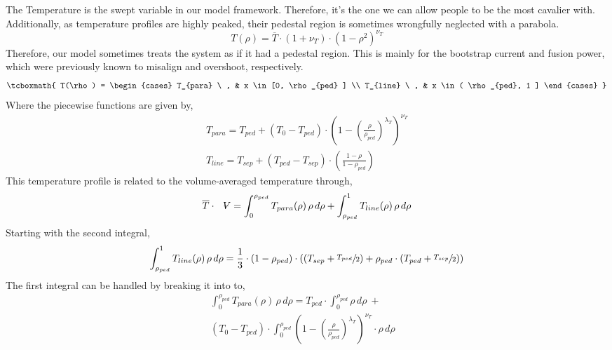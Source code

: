 The Temperature is the swept variable in our model framework. Therefore, it's the one we can allow people to be the most cavalier with. Additionally, as temperature profiles are highly peaked, their pedestal region is sometimes wrongfully neglected with a parabola.
\begin{equation}
	T(\rho) = \overline{T} \cdot \left(1 + \nu_T \right) \cdot \left( 1 - \rho^2  \right)^{\nu_T}
\end{equation}
Therefore, our model sometimes treats the system as if it had a pedestal region. This is mainly for the bootstrap current and fusion power, which were previously known to misalign and overshoot, respectively.
\begin{equation}
	\tcboxmath{
	T(\rho) = 
	\begin{cases}
	    T_{para} \ , & x \in [0, \rho_{ped} ] \\
	    T_{line}   \ , & x \in ( \rho_{ped}, 1 ]
	\end{cases}
	}	
\end{equation}
Where the piecewise functions are given by,
\begin{gather}
	T_{para} = T_{ped} + ( T_{0} - T_{ped} ) \cdot \left( 1 - \left( \frac{\rho}{\rho_{ped}} \right)^{\lambda_T} \right)^{\nu_T} \\
	T_{line} = T_{sep} + ( T_{ped} - T_{sep} ) \cdot \left( \frac{ 1 - \rho }{ 1 - \rho_{ped} } \right)
\end{gather}
This temperature profile is related to the volume-averaged temperature through,
\begin{equation}
	\overline{T} \cdot \volume = \int_0^{\rho_{ped}} T_{para}(\rho) \, \rho \, d\rho + \int_{\rho_{ped}}^1 T_{line}(\rho) \, \rho \, d\rho
\end{equation}
Starting with the second integral,
\begin{equation}
	\int_{\rho_{ped}}^1 T_{line}(\rho) \, \rho \, d\rho = \frac{1}{3} \cdot ( 1 - \rho_{ped} ) \cdot \left( \left( T_{sep} + \sfrac{ T_{ped} }{2} \right) + \rho_{ped} \cdot \left( T_{ped} + \sfrac{ T_{sep} }{2}  \right)  \right)
\end{equation}
The first integral can be handled by breaking it into to,
\begin{multline}
	\int_0^{\rho_{ped}} T_{para}(\rho) \, \rho \, d\rho = T_{ped} \cdot \int_0^{\rho_{ped}} \rho \, d\rho \ + \\ ( T_{0} - T_{ped} ) \cdot \int_0^{\rho_{ped}} \left( 1 - \left( \frac{\rho}{\rho_{ped}} \right)^{\lambda_T} \right)^{\nu_T}  \cdot \rho \, d\rho \ \ \  \
\end{multline}

